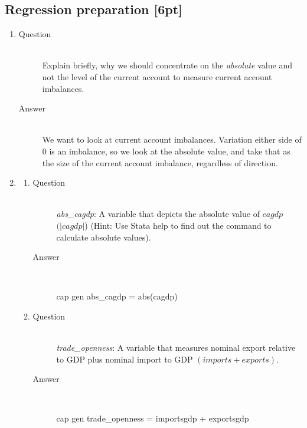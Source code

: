 \documentclass{article}
\begin{document}
\subsection{Regression preparation [6pt]}
  \begin{enumerate}[label=(\alph*)]
    \item 
    \begin{description}
      \item[Question] \hfill \\
      Explain briefly, why we should concentrate on the \textit{absolute} value and not the level of the current account to measure current account imbalances.
      \item[Answer] \hfill \\
      We want to look at current account imbalances. Variation either side of 0 is an imbalance, so we look at the absolute value, and take that as the size of the current account imbalance, regardless of direction.
    \end{description}
    \item
    \begin{enumerate}[label=(\roman*)]
      \item 
      \begin{description}
        \item[Question] \hfill \\
        \textit{abs\_cagdp}: A variable that depicts the absolute value of $cagdp$ $ (|cagdp|$) (Hint: Use Stata help to find out the command to calculate absolute values).
        \item[Answer] \hfill \\
        \begin{CVerbatim}
  cap gen abs_cagdp = abs(cagdp)
        \end{CVerbatim}
      \end{description}
      \item 
      \begin{description}
        \item[Question] \hfill \\
        \textit{trade\_openness}: A variable that measures nominal export relative to GDP plus nominal import to GDP $(imports+exports)$.
        \item[Answer] \hfill \\
        \begin{CVerbatim}
  cap gen trade_openness = importsgdp + exportsgdp
        \end{CVerbatim}
      \end{description}

\end{enumerate}
\end{enumerate}
\end{document}
